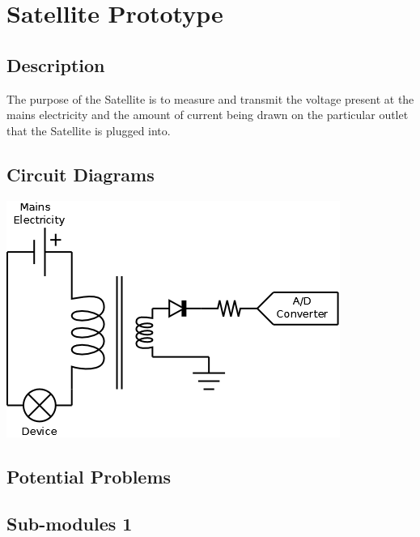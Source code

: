 
\chapter{Satellite Prototype}

\section{Description}

The purpose of the Satellite is to measure and transmit the voltage present at
the mains electricity and the amount of current being drawn on the particular outlet that
the Satellite is plugged into.

\section{Circuit Diagrams}

\includegraphics[scale=0.3]{Hardware/images/MeasureCircuit.png}

\section{Potential Problems}


\section{Sub-modules 1}

